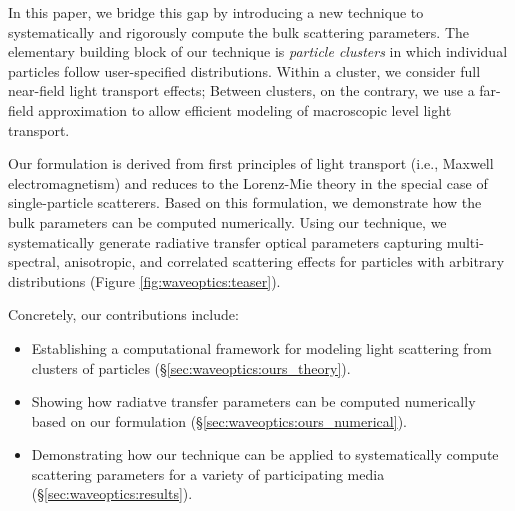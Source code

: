 In this paper, we bridge this gap by introducing a new technique to systematically and rigorously compute the bulk scattering parameters.
The elementary building block of our technique is \emph{particle clusters} in which individual particles follow user-specified distributions.
Within a cluster, we consider full near-field light transport effects; Between clusters, on the contrary, we use a far-field approximation to allow efficient modeling of macroscopic level light transport.

Our formulation is derived from first principles of light transport (i.e., Maxwell electromagnetism) and reduces to the Lorenz-Mie theory in the special case of single-particle scatterers. Based on this formulation, we demonstrate how the bulk parameters can be computed numerically. Using our technique, we systematically generate radiative transfer optical parameters capturing multi-spectral, anisotropic, and correlated scattering effects for particles with arbitrary distributions (Figure \ref{fig:waveoptics:teaser}).

Concretely, our contributions include:
\begin{itemize}
    \item Establishing a computational framework for modeling light scattering from clusters of particles (\S\ref{sec:waveoptics:ours_theory}).
    \item Showing how radiatve transfer parameters can be computed numerically based on our formulation (\S\ref{sec:waveoptics:ours_numerical}).
    \item Demonstrating how our technique can be applied to systematically compute scattering parameters for a variety of participating media (\S\ref{sec:waveoptics:results}).
\end{itemize}

